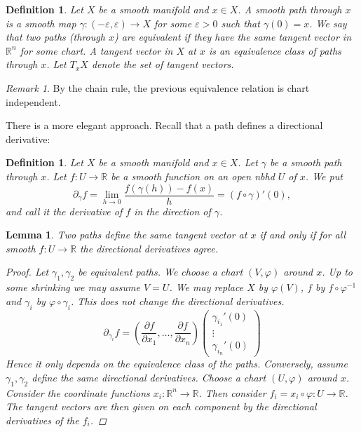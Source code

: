 \documentclass[12pt]{article}
\theoremstyle{darkgreentheorem}
\newtheorem{lm}[thm]{Lemma}
\theoremstyle{darkbluedefinition}
\newtheorem{defn}[thm]{Definition}
\theoremstyle{darkredexample}
\theoremstyle{remark}
\newtheorem{rem}[thm]{Remark}
\newcommand{\R}{\mathbb{R}}
\newcommand{\1}{\mathbbm{1}}
\begin{document}
\begin{defn}
    Let $X$ be a smooth manifold and $x\in X$.
    A \textit{smooth path} through $x$ is a smooth map $\gamma\colon (-\varepsilon ,\varepsilon )\to X$ for some $\varepsilon >0$ such that $\gamma(0)=x$.
    We say that two paths (through $x$) are equivalent if they have the same tangent vector in $\R^{n}$ for some chart.
    A \textit{tangent vector} in $X$ at $x$ is an equivalence class of paths through $x$.
    Let $T_{x}X$ denote the set of tangent vectors.
\end{defn}

\begin{rem}
    By the chain rule, the previous equivalence relation is chart independent.
\end{rem}

There is a more elegant approach.
Recall that a path defines a directional derivative:

\begin{defn}
    Let $X$ be a smooth manifold and $x\in X$.
    Let $\gamma $ be a smooth path through $x$.
    Let $f\colon U\to \R$ be a smooth function on an open nbhd $U$ of $x$.
    We put
    \[ \partial_{\gamma}f=\lim_{h\to 0}\frac{f(\gamma(h))-f(x)}{h}=(f\circ \gamma)'(0),\]
    and call it the \textit{derivative of $f$ in the direction of $\gamma$}.
\end{defn}

\begin{lm}
    Two paths define the same tangent vector at $x$ if and only if for all smooth $f\colon U\to \R$ the directional derivatives agree.
    \begin{proof}
	Let $\gamma_{1},\gamma_{2}$ be equivalent paths.
	We choose a chart $(V,\varphi)$ around $x$.
	Up to some shrinking we may assume $V=U$.
	We may replace $X$ by $\varphi(V)$, $f$ by $f\circ \varphi^{-1}$ and $\gamma_{i}$ by $\varphi\circ \gamma_{i}$.
	This does not change the directional derivatives.
	\[ \partial_{\gamma_{i}}f=\left( \frac{\partial f}{\partial x_{1}},\ldots,\frac{\partial f}{\partial x_{n}}\right )\begin{pmatrix} \gamma_{i_{1}}'(0) \\ \vdots \\ \gamma_{i_{n}}'(0)\end{pmatrix} \]
	Hence it only depends on the equivalence class of the paths.
	Conversely, assume $\gamma_{1},\gamma_{2}$ define the same directional derivatives.
	Choose a chart $(U,\varphi)$ around $x$.
	Consider the coordinate functions $x_{i}\colon \R^{n}\to \R$.
	Then consider $f_{i}=x_{i}\circ \varphi \colon U\to \R$.
	The tangent vectors are then given on each component by the directional derivatives of the $f_{i}$.
    \end{proof}
\end{lm}
\end{document}
